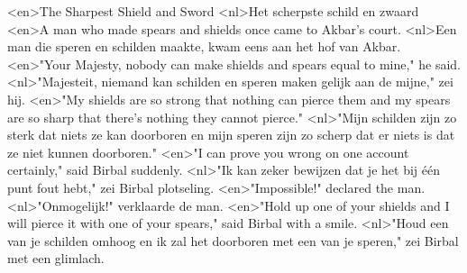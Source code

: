 <en>The Sharpest Shield and Sword
<nl>Het scherpste schild en zwaard
<en>A man who made spears and shields once came to Akbar's court.
<nl>Een man die speren en schilden maakte, kwam eens aan het hof van Akbar.
<en>"Your Majesty, nobody can make shields and spears equal to mine," he said.
<nl>"Majesteit, niemand kan schilden en speren maken gelijk aan de mijne," zei hij.
<en>"My shields are so strong that nothing can pierce them and my spears are so sharp that there's nothing they cannot pierce."
<nl>"Mijn schilden zijn zo sterk dat niets ze kan doorboren en mijn speren zijn zo scherp dat er niets is dat ze niet kunnen doorboren."
<en>"I can prove you wrong on one account certainly," said Birbal suddenly.
<nl>"Ik kan zeker bewijzen dat je het bij één punt fout hebt," zei Birbal plotseling.
<en>"Impossible!" declared the man.
<nl>"Onmogelijk!" verklaarde de man.
<en>"Hold up one of your shields and I will pierce it with one of your spears," said Birbal with a smile.
<nl>"Houd een van je schilden omhoog en ik zal het doorboren met een van je speren," zei Birbal met een glimlach.
